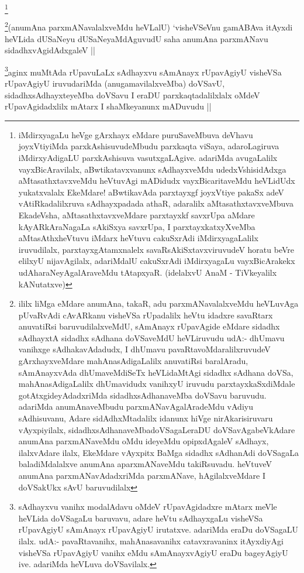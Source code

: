 \footnote{iMdirxyagaLu heVge gArxhayx eMdare puruSaveMbuva deVhavu joyxVtiyiMda parxkAshisuvudeMbudu parxkaqta viSaya, adaroLagiruva iMdirxyAdigaLU parxkAshisuva vasutxgaLAgive. adariMda avugaLalilx vayxBicAravilalx, aBwtikatavxvanunx sAdhayxveMdu udedxVshisidAdxga aMtasathxtavxveMdu heVtuvAgi mADidudx vayxBicaritaveMdu heVLidUdx yukatxvalalx EkeMdare! aBwtikavAda parxtayxgf joyxVtiye pakaSx adeV vAtiRkadalilxruva sAdhayxpadada athaR, adaralilx aMtasathxtavxveMbuva EkadeVsha, aMtasathxtavxveMdare parxtayxkf savxrUpa aMdare kAyARkAraNagaLa sAkiSxya savxrUpa, I parxtayxkatxyXveMba aMtasAthxheVtuvu iMdarx heVtuvu cakuSxrAdi iMdirxyagaLalilx iruvudilalx, parxtayxgAtamxnalelx savaRsAkiSxtavxviruvudeV horatu beVre elilxyU nijavAgilalx, adariMdalU cakuSxrAdi iMdirxyagaLu vayxBicArakekx udAharaNeyAgalAraveMdu tAtapxyaR. (idelalxvU AnaM - TiVkeyalilx kANutatxve)}

\begin{artha}
\footnote{ililx liMga eMdare anumAna, takaR, adu parxmANavalalxveMdu heVLuvAga pUvaRvAdi cAvARkanu visheVSa rUpadalilx heVtu idadxre savaRtarx anuvatiRsi baruvudilalxveMdU, sAmAnayx rUpavAgide eMdare sidadhx sAdhayxtA sidadhx sAdhana doVSaveMdU heVLiruvudu udA:- dhUmavu vanihxge sAdhakavAdadudx, I dhUmavu pavaRtavoMdaralilxruvudeV gArxhayxveMdare mahAnasAdigaLalilx anuvatiRsi baralAradu, sAmAnayxvAda dhUmaveMdiSeTx heVLidaMtAgi sidadhx sAdhana doVSa, mahAnasAdigaLalilx dhUmavidudx vanihxyU iruvudu parxtayxkaSxdiMdale gotAtxgideyAdadxriMda sidadhxsAdhanaveMba doVSavu baruvudu. adariMda anumAnaveMbudu parxmANavAgalAradeMdu vAdiyu sAdhisuvanu, Adare sidAdhxMtadalilx idanunx hiVge nirAkarisiruvaru vAyxpiyilalx, sidadhxsAdhanaveMbadoVSagaLeraDU doVSavAgabeVkAdare anumAna parxmANaveMdu oMdu ideyeMdu opipxdAgaleV sAdhayx, ilalxvAdare ilalx, EkeMdare vAyxpitx BaMga sidadhx sAdhanAdi doVSagaLa baladiMdalalxve anumAna aparxmANaveMdu takiRsuvadu. heVtuveV anumAna parxmANavAdadxriMda parxmANave, hAgilalxveMdare I doVSakUkx sAvU baruvudilalx}(anumAna parxmANavalalxveMdu heVLalU) `visheVSeV\s nu gamABAva itAyxdi heVLida dUSaNeyu dUSaNeyaMdAguvudU saha anumAna parxmANavu sidadhxvAgidAdxgaleV ||
\end{artha}

\begin{artha}
\footnote{sAdhayxvu vanihx modalAdavu oMdeV rUpavAgidadxre mAtarx meVle heVLida doVSagaLu baruvavu, adare heVtu sAdhayxgaLu visheVSa rUpavAgiyU sAmAnayx rUpavAgiyU irutatxve. adariMda eraDu doVSagaLU ilalx. udA:- pavaRtavanihx, mahAnasavanihx catavxravaninx itAyxdiyAgi visheVSa rUpavAgiyU vanihx eMdu sAmAnayxvAgiyU eraDu bageyAgiyU ive. adariMda heVLuva doVSavilalx.}aginx muMtAda rUpavuLaLx sAdhayxvu sAmAnayx rUpavAgiyU visheVSa rUpavAgiyU iruvudariMda (anugamavilalxveMba) doVSavU, sidadhxsAdhayxteyeMba doVSavu I eraDU parxkaqtadalilxlalx oMdeV rUpavAgidadxlilx mAtarx I shaMkeyanunx mADuvudu ||
\end{artha}

